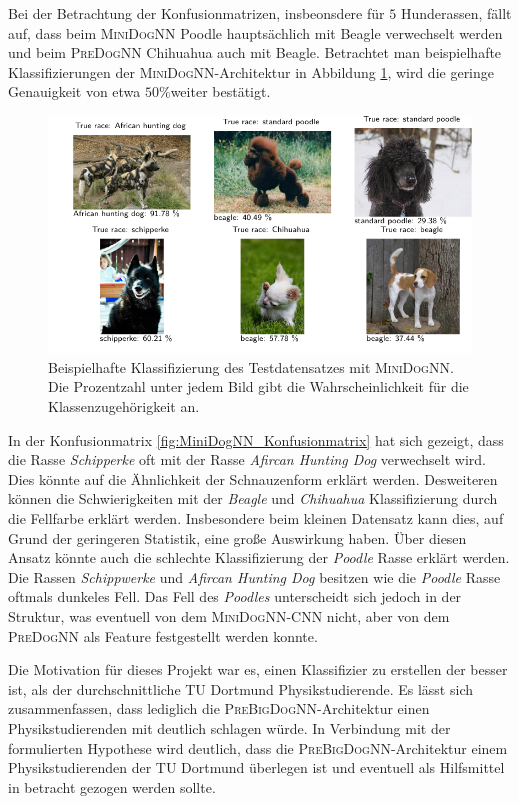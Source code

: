 Bei der Betrachtung der Konfusionmatrizen, insbeonsdere für $5$ Hunderassen,
fällt auf, dass beim \textsc{MiniDogNN} Poodle hauptsächlich mit Beagle verwechselt
werden und beim \textsc{PreDogNN} Chihuahua auch mit Beagle. Betrachtet man
beispielhafte Klassifizierungen der \textsc{MiniDogNN}-Architektur in Abbildung \ref{fig:klasifizierung_MiniDogNN},
wird die geringe Genauigkeit von etwa $50\%$weiter bestätigt.
\begin{figure}
\centering
\includegraphics[width = \textwidth]{../../final_data/MiniNN_n5/visualize_predictions.pdf}
\caption{Beispielhafte Klassifizierung des Testdatensatzes mit \textsc{MiniDogNN}.
        Die Prozentzahl unter jedem Bild gibt die Wahrscheinlichkeit für die Klassenzugehörigkeit an.}
\label{fig:klasifizierung_MiniDogNN}
\end{figure}
In der Konfusionmatrix \ref{fig:MiniDogNN_Konfusionmatrix} hat sich gezeigt, dass
die Rasse \emph{Schipperke} oft mit der Rasse \emph{Afircan Hunting Dog} verwechselt
wird. Dies könnte auf die Ähnlichkeit der Schnauzenform erklärt werden. Desweiteren
können die Schwierigkeiten mit der \emph{Beagle} und \emph{Chihuahua} Klassifizierung
durch die Fellfarbe erklärt werden. Insbesondere beim kleinen Datensatz kann dies,
auf Grund der geringeren Statistik, eine große Auswirkung haben. Über diesen Ansatz
könnte auch die schlechte Klassifizierung der \emph{Poodle} Rasse erklärt werden.
Die Rassen \emph{Schippwerke} und \emph{Afircan Hunting Dog} besitzen wie die
\emph{Poodle} Rasse oftmals dunkeles Fell. Das Fell des \emph{Poodles} unterscheidt sich jedoch
in der Struktur, was eventuell von dem \textsc{MiniDogNN}-CNN nicht, aber von dem
\textsc{PreDogNN} als Feature festgestellt werden konnte.

Die Motivation für dieses Projekt war es, einen Klassifizier zu erstellen
der besser ist, als der durchschnittliche TU Dortmund Physikstudierende.
Es lässt sich zusammenfassen, dass lediglich die \textsc{PreBigDogNN}-Architektur
einen Physikstudierenden mit deutlich schlagen würde. In Verbindung mit
der formulierten Hypothese wird deutlich, dass die \textsc{PreBigDogNN}-Architektur
einem Physikstudierenden der TU Dortmund überlegen ist und eventuell als Hilfsmittel
in betracht gezogen werden sollte.

